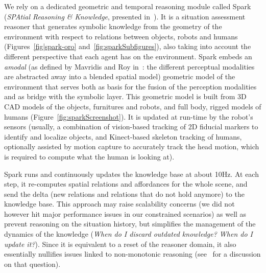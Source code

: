\documentclass[preprint,3p,times]{elsarticle}
\begin{document}
We rely on a dedicated geometric and temporal reasoning module called {\sc
Spark} (\emph{SPAtial Reasoning \& Knowledge}, presented in~\cite{Sisbot2011}).
It is a situation assessment reasoner that generates symbolic knowledge from the
geometry of the environment with respect to relations between objects, robots
and humans (Figures~\ref{fig|spark-oro} and~\ref{fig:sparkSubfigures}), also
taking into account the different perspective that each agent has on the
environment.  {\sc Spark} embeds an \emph{amodal} (as defined by Mavridis and
Roy in~\cite{Mavridis2006}: the different perceptual modalities are abstracted
away into a blended spatial model) geometric model of the environment that
serves both as basis for the fusion of the perception modalities and as bridge
with the symbolic layer. This geometric model is built from 3D CAD models of the
objects, furnitures and robots, and full body, rigged models of humans
(Figure~\ref{fig:sparkScreenshot}).  It is updated at run-time by the robot's
sensors (usually, a combination of vision-based tracking of 2D fiducial markers
to identify and localize objects, and Kinect-based skeleton tracking of humans,
optionally assisted by motion capture to accurately track the head motion, which
is required to compute what the human is looking at).

{\sc Spark} runs and continuously updates the knowledge base at about 10Hz. At
each step, it re-computes spatial relations and affordances for the whole scene,
and send the delta (new relations and relations that do not hold anymore) to the
knowledge base. This approach may raise scalability concerns (we did not however
hit major performance issues in our constrained scenarios) as well as prevent
reasoning on the situation history, but simplifies the management of the
dynamics of the knowledge (\emph{When do I discard outdated knowledge?  When do
I update it?}). Since it is equivalent to a reset of the reasoner domain, it
also essentially nullifies issues linked to non-monotonic reasoning
(see~\cite{McCarthy2007} for a discussion on that question).
\end{document}

